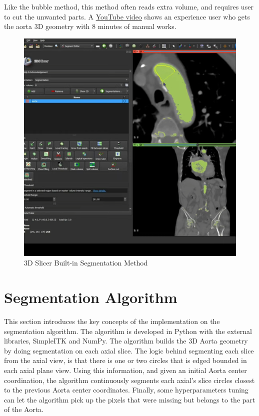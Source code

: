 Like the bubble method, this method often reads extra volume, and requires user to cut the unwanted parts. A \href{https://www.youtube.com/watch?v=5_673cHMBiY}{YouTube video} shows an experience user who gets the aorta 3D geometry with 8 minutes of manual works. 

\begin{figure}[H]
    \centering
    \includegraphics[width=\textwidth]{figures/Sample/3D-Slicer-Segmentation.png}
    \caption[3D Slicer Built-in Segmentation UI]{3D Slicer Built-in Segmentation Method \cite{Kikinis2014}}
    \label{fig_3D_Seg_Builtin}
\end{figure}

\section{Segmentation Algorithm}

This section introduces the key concepts of the implementation on the segmentation algorithm. The algorithm is developed in Python with the external libraries, SimpleITK and NumPy. The algorithm builds the 3D Aorta geometry by doing segmentation on each axial slice. The logic behind segmenting each slice from the axial view, is that there is one or two circles that is edged bounded in each axial plane view. Using this information, and given an initial Aorta center coordination, the algorithm continuously segments each axial's slice circles closest to the previous Aorta center coordinates. Finally, some hyperparameters tuning can let the algorithm pick up the pixels that were missing but belongs to the part of the Aorta.

